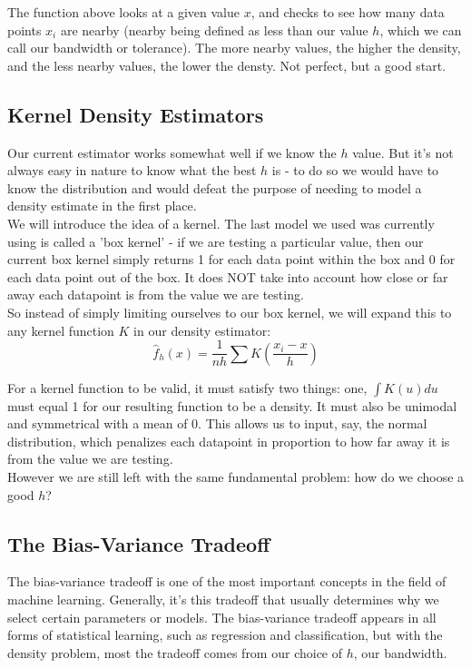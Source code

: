 \documentclass[12pt]{article}
\begin{document}
The function above looks at a given value $x$, and checks to see how many data points $x_i$ are nearby (nearby being defined as less than our value $h$, which we can call our bandwidth or tolerance). The more nearby values, the higher the density, and the less nearby values, the lower the densty. Not perfect, but a good start.
\subsection{Kernel Density Estimators}
Our current estimator works somewhat well if we know the $h$ value. But it's not always easy in nature to know what the best $h$ is - to do so we would have to know the distribution and would defeat the purpose of needing to model a density estimate in the first place. \\

We will introduce the idea of a kernel. The last model we used was currently using is called a 'box kernel' - if we are testing a particular value, then our current box kernel simply returns 1 for each data point within the box and 0 for each data point out of the box. It does NOT take into account how close or far away each datapoint is from the value we are testing. \\

So instead of simply limiting ourselves to our box kernel, we will expand this to any kernel function $K$ in our density estimator: 
$$ \hat{f}_h(x) = \frac{1}{nh} \sum K (\frac{x_i - x}{h}) $$

For a kernel function to be valid, it must satisfy two things: one, $ \int K(u)du$ must equal 1 for our resulting function to be a density. It must also be unimodal and symmetrical with a mean of 0. This allows us to input, say, the normal distribution, which penalizes each datapoint in proportion to how far away it is from the value we are testing. \\

However we are still left with the same fundamental problem: how do we choose a good $h$?
\subsection{The Bias-Variance Tradeoff}
The bias-variance tradeoff is one of the most important concepts in the field of machine learning. Generally, it's this tradeoff that usually determines why we select certain parameters or models. The bias-variance tradeoff appears in all forms of statistical learning, such as regression and classification, but with the density problem, most the tradeoff comes from our choice of $h$, our bandwidth. \\
\end{document}
